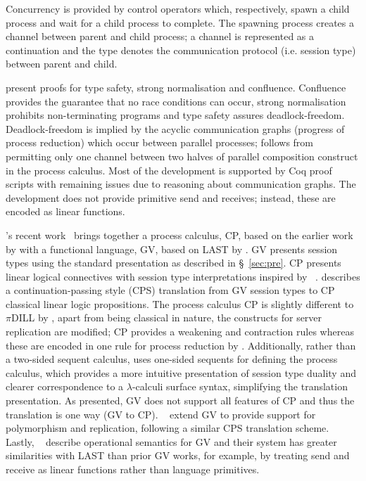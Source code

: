 \documentclass{mpaper}
\begin{document}
Concurrency is provided by control operators which, respectively, spawn a
child process and wait for a child process to complete. The spawning process
creates a channel between parent and child process; a channel is represented
as a continuation and the type denotes the communication protocol
(i.e. session type) between parent and child.

\citeauthor{Mazurak:2010:LCC} present proofs for type safety, strong
normalisation and confluence. Confluence provides the guarantee that no race
conditions can occur, strong normalisation prohibits non-terminating programs
and type safety assures deadlock-freedom. Deadlock-freedom is implied by the
acyclic communication graphs (progress of process reduction) which occur
between parallel processes; follows from permitting only one channel between
two halves of parallel composition construct in the process calculus. Most of
the development is supported by Coq proof scripts with remaining issues due to
reasoning about communication graphs. The development does not provide
primitive send and receives; instead, these are encoded as linear functions.

\citeauthor{Wadler:2014}'s recent work~\cite{Wadler:2014} brings together a
process calculus, CP, based on the earlier work by
\citeauthor{Caires:2010:STI} with a functional language, GV, based on LAST by
\citeauthor{Gay:2010:LAST}. GV presents session types using the standard
presentation as described in \S~\ref{sec:pre}. CP presents linear logical
connectives with session type interpretations inspired by
\citeauthor{Caires:2010:STI}~\cite{Caires:2010:STI}. \citeauthor{Wadler:2014}
describes a continuation-passing style (CPS) translation from GV session types
to CP classical linear logic propositions. The process calculus CP is slightly
different to $\pi$DILL by \citeauthor{Caires:2010:STI}, apart from being
classical in nature, the constructs for server replication are modified; CP
provides a weakening and contraction rules whereas these are encoded in one
rule for process reduction by \citeauthor{Caires:2010:STI}. Additionally,
rather than a two-sided sequent calculus, \citeauthor{Wadler:2014} uses
one-sided sequents for defining the process calculus, which provides a more
intuitive presentation of session type duality and clearer correspondence to a
$\lambda$-calculi surface syntax, simplifying the translation presentation. As
presented, GV does not support all features of CP and thus the translation is
one way (GV to CP). \citeauthor{Lindley:2014:SAP}~\cite{Lindley:2014:SAP}
extend GV to provide support for polymorphism and replication, following a
similar CPS translation scheme. Lastly,
\citeauthor{Lindley:2014:SPS}~\cite{Lindley:2014:SPS} describe operational
semantics for GV and their system has greater similarities with LAST than
prior GV works, for example, by treating send and receive as linear functions
rather than language primitives.
\end{document}

